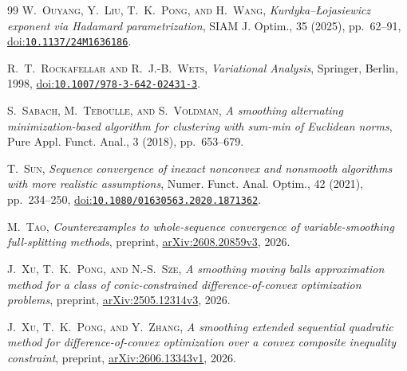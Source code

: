 \documentclass[9pt]{article}
\numberwithin{equation}{section}
\theoremstyle{definition}
\theoremstyle{remark}
\newcommand{\doi}[1]{\href{https://doi.org/#1}{doi:\nolinkurl{#1}}}
\begin{document}
\begin{thebibliography}{99}
\textsc{W.~Ouyang, Y.~Liu, T.~K.~Pong, and H.~Wang},
\emph{Kurdyka--\L{}ojasiewicz exponent via Hadamard parametrization},
SIAM J. Optim., 35 (2025), pp.~62--91,
\doi{10.1137/24M1636186}.

\textsc{R.~T.~Rockafellar and R.~J.-B.~Wets},
\emph{Variational Analysis}, Springer, Berlin, 1998,
\doi{10.1007/978-3-642-02431-3}.

\textsc{S.~Sabach, M.~Teboulle, and S.~Voldman},
\emph{A smoothing alternating minimization-based algorithm for
clustering with sum-min of Euclidean norms}, Pure Appl. Funct. Anal.,
3 (2018), pp.~653--679.

\textsc{T.~Sun},
\emph{Sequence convergence of inexact nonconvex and nonsmooth
algorithms with more realistic assumptions}, Numer. Funct. Anal.
Optim., 42 (2021), pp.~234--250,
\doi{10.1080/01630563.2020.1871362}.


\textsc{M.~Tao},
\emph{Counterexamples to whole-sequence convergence of
variable-smoothing full-splitting methods}, preprint,
\href{https://arxiv.org/abs/2608.20859v3}{arXiv:2608.20859v3}, 2026.



\textsc{J.~Xu, T.~K.~Pong, and N.-S.~Sze},
\emph{A smoothing moving balls approximation method for a class of
conic-constrained difference-of-convex optimization problems}, preprint,
\href{https://arxiv.org/abs/2505.12314v3}{arXiv:2505.12314v3}, 2026.

\textsc{J.~Xu, T.~K.~Pong, and Y.~Zhang},
\emph{A smoothing extended sequential quadratic method for
difference-of-convex optimization over a convex composite inequality
constraint}, preprint,
\href{https://arxiv.org/abs/2606.13343v1}{arXiv:2606.13343v1}, 2026.

\end{thebibliography}
\end{document}
